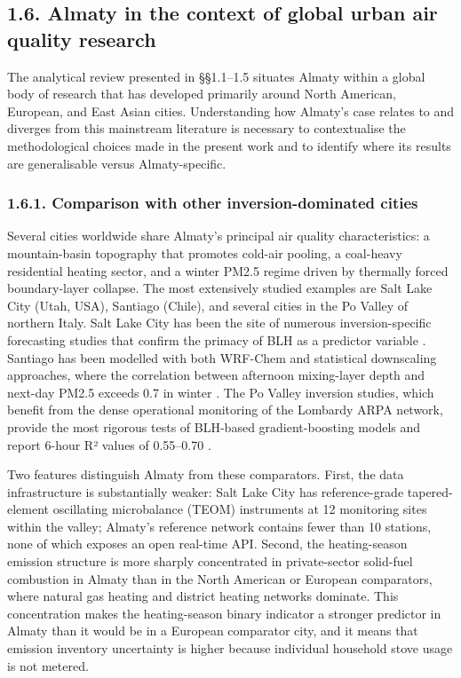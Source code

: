 \subsection{1.6. Almaty in the context of global urban air quality research}\label{almaty-in-the-context-of-global-urban-air-quality-research}

The analytical review presented in §§1.1--1.5 situates Almaty within a global body of research that has developed primarily around North American, European, and East Asian cities. Understanding how Almaty's case relates to and diverges from this mainstream literature is necessary to contextualise the methodological choices made in the present work and to identify where its results are generalisable versus Almaty-specific.

\subsubsection{1.6.1. Comparison with other inversion-dominated cities}\label{comparison-with-other-inversion-dominated-cities}

Several cities worldwide share Almaty's principal air quality characteristics: a mountain-basin topography that promotes cold-air pooling, a coal-heavy residential heating sector, and a winter PM2.5 regime driven by thermally forced boundary-layer collapse. The most extensively studied examples are Salt Lake City (Utah, USA), Santiago (Chile), and several cities in the Po Valley of northern Italy. Salt Lake City has been the site of numerous inversion-specific forecasting studies that confirm the primacy of BLH as a predictor variable \cite{Silcox2012winterPM25, Whiteman2014SLV}. Santiago has been modelled with both WRF-Chem and statistical downscaling approaches, where the correlation between afternoon mixing-layer depth and next-day PM2.5 exceeds 0.7 in winter \cite{menares2021forecasting}. The Po Valley inversion studies, which benefit from the dense operational monitoring of the Lombardy ARPA network, provide the most rigorous tests of BLH-based gradient-boosting models and report 6-hour R² values of 0.55--0.70 \cite{stafoggia2019estimation}.

Two features distinguish Almaty from these comparators. First, the data infrastructure is substantially weaker: Salt Lake City has reference-grade tapered-element oscillating microbalance (TEOM) instruments at 12 monitoring sites within the valley; Almaty's reference network contains fewer than 10 stations, none of which exposes an open real-time API. Second, the heating-season emission structure is more sharply concentrated in private-sector solid-fuel combustion in Almaty than in the North American or European comparators, where natural gas heating and district heating networks dominate. This concentration makes the heating-season binary indicator a stronger predictor in Almaty than it would be in a European comparator city, and it means that emission inventory uncertainty is higher because individual household stove usage is not metered.

